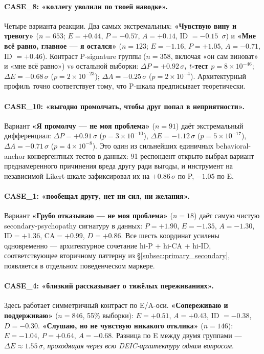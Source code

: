 \paragraph{CASE\_8: «коллегу уволили по твоей наводке».} Четыре варианта реакции. Два самых экстремальных: \textbf{«Чувствую вину и тревогу»} ($n = 653$; $E = +0.44$, $P = -0.57$, $A = +0.14$, ID $= -0.15$~$\sigma$) и \textbf{«Мне всё равно, главное --- я остался»} ($n = 123$; $E = -1.16$, $P = +1.05$, $A = -0.71$, ID $= +0.46$). Контраст P-signature группы ($n = 358$, включая «он сам виноват» и «мне всё равно») vs остальной выборки: \textbf{$\Delta P = +0.92\,\sigma$, $t$-тест $p = 8 \times 10^{-46}$}; $\Delta E = -0.68\,\sigma$ ($p = 2 \times 10^{-23}$); $\Delta A = -0.25\,\sigma$ ($p = 2 \times 10^{-4}$). Архитектурный профиль точно соответствует тому, что P-шкала предписывает теоретически.

\paragraph{CASE\_10: «выгодно промолчать, чтобы друг попал в неприятности».} Вариант \textbf{«Я промолчу --- не моя проблема»} ($n = 91$) даёт экстремальный дифференциал: $\Delta P = +0.91\,\sigma$ ($p = 3 \times 10^{-10}$), $\Delta E = -1.12\,\sigma$ ($p = 5 \times 10^{-17}$), $\Delta A = -0.71\,\sigma$ ($p = 4 \times 10^{-8}$). Это один из сильнейших единичных behavioral-anchor конвергентных тестов в данных: 91 респондент открыто выбрал вариант преднамеренного причинения вреда другу ради выгоды, и инструмент на независимой Likert-шкале зафиксировал их на ${+}0.86\,\sigma$ по P, ${-}1.05$ по E.

\paragraph{CASE\_1: «пообещал другу, нет ни сил, ни желания».} Вариант \textbf{«Грубо отказываю --- не моя проблема»} ($n = 18$) даёт самую чистую secondary-psychopathy сигнатуру в данных: $P = +1.90$, $E = -1.35$, $A = -1.30$, $\text{ID} = +1.36$, $\text{CA} = +0.99$, $D = +0.86$. Все шесть координат усилены одновременно --- архитектурное сочетание hi-P + hi-CA + hi-ID, соответствующее вторичному паттерну из §\ref{subsec:primary_secondary}, появляется в отдельном поведенческом маркере.

\paragraph{CASE\_4: «близкий рассказывает о тяжёлых переживаниях».} Здесь работает симметричный контраст по E/A-оси. \textbf{«Сопереживаю и поддерживаю»} ($n = 846$, 55\% выборки): $E = +0.51$, $A = +0.43$, ID $= -0.38$, $D = -0.30$. \textbf{«Слушаю, но не чувствую никакого отклика»} ($n = 146$): $E = -1.04$, $P = +0.64$, $A = -0.68$. Разница по E между двумя группами --- $\Delta E \approx 1.55\,\sigma$, \emph{проходящая через всю DEIC-архитектуру одним вопросом}.

